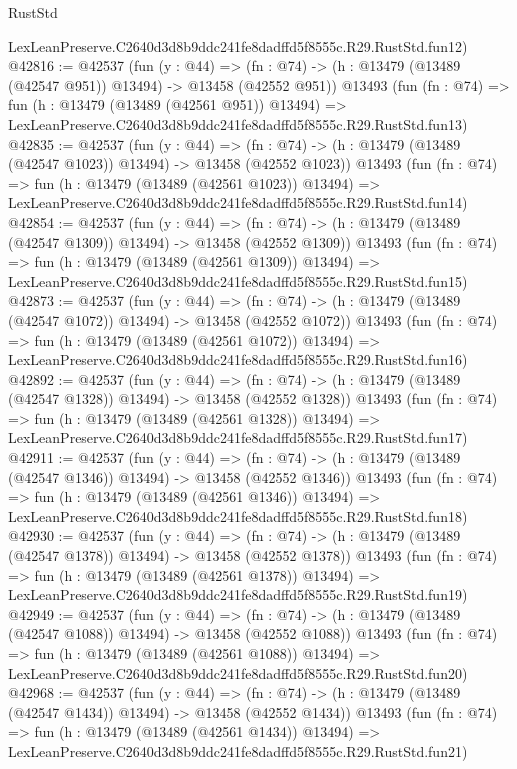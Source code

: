 \begin{lexlean}{RustStd}
\begin{coremodule}
    LexLeanPreserve.C2640d3d8b9ddc241fe8dadffd5f8555c.R29.RustStd.fun12)
@42816 := @42537
    (fun (y : @44) =>
    (fn : @74) -> (h : @13479 (@13489 (@42547 @951)) @13494) -> @13458 (@42552 @951))
    @13493
    (fun (fn : @74) =>
    fun (h : @13479 (@13489 (@42561 @951)) @13494) =>
    LexLeanPreserve.C2640d3d8b9ddc241fe8dadffd5f8555c.R29.RustStd.fun13)
@42835 := @42537
    (fun (y : @44) =>
    (fn : @74) -> (h : @13479 (@13489 (@42547 @1023)) @13494) -> @13458 (@42552 @1023))
    @13493
    (fun (fn : @74) =>
    fun (h : @13479 (@13489 (@42561 @1023)) @13494) =>
    LexLeanPreserve.C2640d3d8b9ddc241fe8dadffd5f8555c.R29.RustStd.fun14)
@42854 := @42537
    (fun (y : @44) =>
    (fn : @74) -> (h : @13479 (@13489 (@42547 @1309)) @13494) -> @13458 (@42552 @1309))
    @13493
    (fun (fn : @74) =>
    fun (h : @13479 (@13489 (@42561 @1309)) @13494) =>
    LexLeanPreserve.C2640d3d8b9ddc241fe8dadffd5f8555c.R29.RustStd.fun15)
@42873 := @42537
    (fun (y : @44) =>
    (fn : @74) -> (h : @13479 (@13489 (@42547 @1072)) @13494) -> @13458 (@42552 @1072))
    @13493
    (fun (fn : @74) =>
    fun (h : @13479 (@13489 (@42561 @1072)) @13494) =>
    LexLeanPreserve.C2640d3d8b9ddc241fe8dadffd5f8555c.R29.RustStd.fun16)
@42892 := @42537
    (fun (y : @44) =>
    (fn : @74) -> (h : @13479 (@13489 (@42547 @1328)) @13494) -> @13458 (@42552 @1328))
    @13493
    (fun (fn : @74) =>
    fun (h : @13479 (@13489 (@42561 @1328)) @13494) =>
    LexLeanPreserve.C2640d3d8b9ddc241fe8dadffd5f8555c.R29.RustStd.fun17)
@42911 := @42537
    (fun (y : @44) =>
    (fn : @74) -> (h : @13479 (@13489 (@42547 @1346)) @13494) -> @13458 (@42552 @1346))
    @13493
    (fun (fn : @74) =>
    fun (h : @13479 (@13489 (@42561 @1346)) @13494) =>
    LexLeanPreserve.C2640d3d8b9ddc241fe8dadffd5f8555c.R29.RustStd.fun18)
@42930 := @42537
    (fun (y : @44) =>
    (fn : @74) -> (h : @13479 (@13489 (@42547 @1378)) @13494) -> @13458 (@42552 @1378))
    @13493
    (fun (fn : @74) =>
    fun (h : @13479 (@13489 (@42561 @1378)) @13494) =>
    LexLeanPreserve.C2640d3d8b9ddc241fe8dadffd5f8555c.R29.RustStd.fun19)
@42949 := @42537
    (fun (y : @44) =>
    (fn : @74) -> (h : @13479 (@13489 (@42547 @1088)) @13494) -> @13458 (@42552 @1088))
    @13493
    (fun (fn : @74) =>
    fun (h : @13479 (@13489 (@42561 @1088)) @13494) =>
    LexLeanPreserve.C2640d3d8b9ddc241fe8dadffd5f8555c.R29.RustStd.fun20)
@42968 := @42537
    (fun (y : @44) =>
    (fn : @74) -> (h : @13479 (@13489 (@42547 @1434)) @13494) -> @13458 (@42552 @1434))
    @13493
    (fun (fn : @74) =>
    fun (h : @13479 (@13489 (@42561 @1434)) @13494) =>
    LexLeanPreserve.C2640d3d8b9ddc241fe8dadffd5f8555c.R29.RustStd.fun21)

\end{coremodule}
\end{lexlean}

